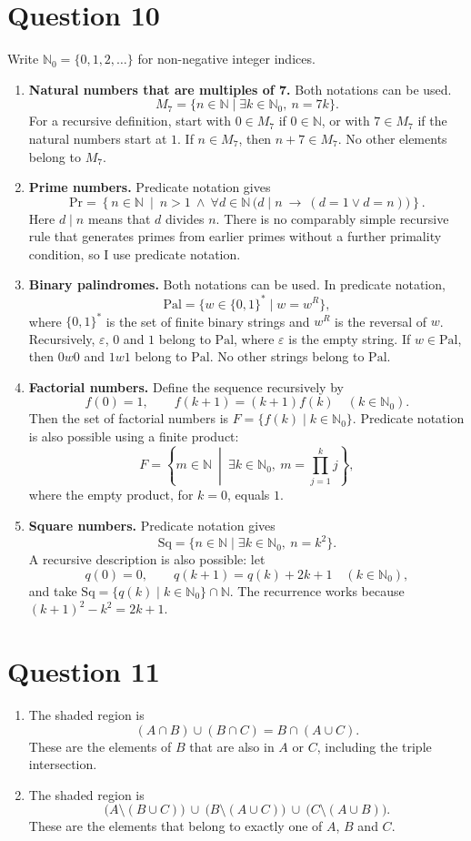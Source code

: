 \documentclass[11pt,a4paper]{article}
\newcommand{\Nzero}{\mathbb{N}_0}
\newcommand{\question}[1]{\Needspace{6\baselineskip}\section*{Question #1}}
\begin{document}
\question{10}
Write $\Nzero=\{0,1,2,\ldots\}$ for non-negative integer indices.
\begin{enumerate}[label=(\roman*)]
\item \textbf{Natural numbers that are multiples of 7.} Both notations can be used.
\[
M_7=\{n\in\mathbb N\mid \exists k\in\Nzero,\ n=7k\}.
\]
For a recursive definition, start with $0\in M_7$ if $0\in\mathbb N$, or with $7\in M_7$ if the natural numbers start at $1$. If $n\in M_7$, then $n+7\in M_7$. No other elements belong to $M_7$.

\item \textbf{Prime numbers.} Predicate notation gives
\[
\mathrm{Pr}=\left\{n\in\mathbb N\ \middle|\ n>1\ \wedge\
\forall d\in\mathbb N\,\bigl(d\mid n\ \to\ (d=1\vee d=n)\bigr)\right\}.
\]
Here $d\mid n$ means that $d$ divides $n$. There is no comparably simple recursive rule that generates primes from earlier primes without a further primality condition, so I use predicate notation.

\item \textbf{Binary palindromes.} Both notations can be used. In predicate notation,
\[
\mathrm{Pal}=\{w\in\{0,1\}^*\mid w=w^R\},
\]
where $\{0,1\}^*$ is the set of finite binary strings and $w^R$ is the reversal of $w$.
Recursively, $\varepsilon$, $0$ and $1$ belong to $\mathrm{Pal}$, where $\varepsilon$ is the empty string. If $w\in\mathrm{Pal}$, then $0w0$ and $1w1$ belong to $\mathrm{Pal}$. No other strings belong to $\mathrm{Pal}$.

\item \textbf{Factorial numbers.} Define the sequence recursively by
\[
f(0)=1,\qquad f(k+1)=(k+1)f(k)\quad(k\in\Nzero).
\]
Then the set of factorial numbers is $F=\{f(k)\mid k\in\Nzero\}$. Predicate notation is also possible using a finite product:
\[
F=\left\{m\in\mathbb N\ \middle|\ \exists k\in\Nzero,\ m=\prod_{j=1}^{k}j\right\},
\]
where the empty product, for $k=0$, equals $1$.

\item \textbf{Square numbers.} Predicate notation gives
\[
\mathrm{Sq}=\{n\in\mathbb N\mid\exists k\in\Nzero,\ n=k^2\}.
\]
A recursive description is also possible: let
\[
q(0)=0,\qquad q(k+1)=q(k)+2k+1\quad(k\in\Nzero),
\]
and take $\mathrm{Sq}=\{q(k)\mid k\in\Nzero\}\cap\mathbb N$.
The recurrence works because $(k+1)^2-k^2=2k+1$.
\end{enumerate}

\question{11}
\begin{enumerate}[label=(\roman*)]
\item The shaded region is
\[
(A\cap B)\cup(B\cap C)=B\cap(A\cup C).
\]
These are the elements of $B$ that are also in $A$ or $C$, including the triple intersection.
\item The shaded region is
\[
\bigl(A\setminus(B\cup C)\bigr)\ \cup\
\bigl(B\setminus(A\cup C)\bigr)\ \cup\
\bigl(C\setminus(A\cup B)\bigr).
\]
These are the elements that belong to exactly one of $A$, $B$ and $C$.
\end{enumerate}
\end{document}
